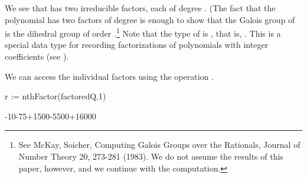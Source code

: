 {{{{{{{{{{{{{{{{{{\begin{xtc}
\begin{TeXOutput}
\begin{fricasmath}{4}
\TIMES {}%
\end{fricasmath}
\end{TeXOutput}
\end{xtc}
%
We see that  has two irreducible factors, each of degree .
(The fact that the polynomial  has two factors of
degree  is enough to show
that the Galois group of  is the dihedral group of
order .\footnote{See McKay, Soicher,  Computing Galois Groups
over the Rationals, Journal of Number Theory 20, 273-281 (1983).
We do not assume the results of this paper, however, and we continue with
the computation.}
Note that the type of  is , that is,
.
This is a special data type for recording factorizations of polynomials with
integer coefficients (see ).
%
\begin{xtc}
\begin{xtccomment}
We can access the individual factors using the operation
.
\end{xtccomment}
\begin{spadsrc}
r := nthFactor(factoredQ,1) 
\end{spadsrc}
\begin{TeXOutput}
\begin{fricasmath}{5}
-{10\TIMES {}}-{75\TIMES {}}+1500\TIMES {}-{5500\TIMES {}}+16000%
\end{fricasmath}
\end{TeXOutput}
\end{xtc}
%

}}}}}}}}}}}}}}}}}}
